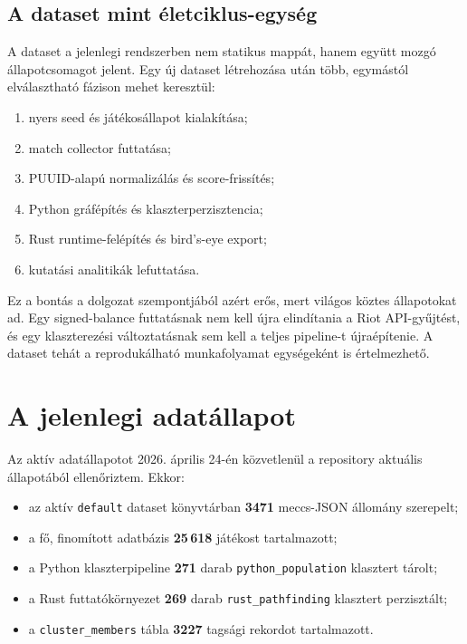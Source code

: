 \documentclass[a4paper,12pt]{report}
\begin{document}
\subsection{A dataset mint életciklus-egység}

A dataset a jelenlegi rendszerben nem statikus mappát, hanem együtt mozgó állapotcsomagot jelent. Egy új dataset létrehozása után több, egymástól elválasztható fázison mehet keresztül:

\begin{enumerate}
    \item nyers seed és játékosállapot kialakítása;
    \item match collector futtatása;
    \item PUUID-alapú normalizálás és score-frissítés;
    \item Python gráfépítés és klaszterperzisztencia;
    \item Rust runtime-felépítés és bird's-eye export;
    \item kutatási analitikák lefuttatása.
\end{enumerate}

Ez a bontás a dolgozat szempontjából azért erős, mert világos köztes állapotokat ad. Egy signed-balance futtatásnak nem kell újra elindítania a Riot API-gyűjtést, és egy klaszterezési változtatásnak sem kell a teljes pipeline-t újraépítenie. A dataset tehát a reprodukálható munkafolyamat egységeként is értelmezhető.

\section{A jelenlegi adatállapot}

Az aktív adatállapotot 2026. április 24-én közvetlenül a repository aktuális állapotából ellenőriztem. Ekkor:

\begin{itemize}
    \item az aktív \texttt{default} dataset könyvtárban \textbf{3471} meccs-JSON állomány szerepelt;
    \item a fő, finomított adatbázis \textbf{25\,618} játékost tartalmazott;
    \item a Python klaszterpipeline \textbf{271} darab \texttt{python\_population} klasztert tárolt;
    \item a Rust futtatókörnyezet \textbf{269} darab \texttt{rust\_pathfinding} klasztert perzisztált;
    \item a \texttt{cluster\_members} tábla \textbf{3227} tagsági rekordot tartalmazott.
\end{itemize}
\end{document}
